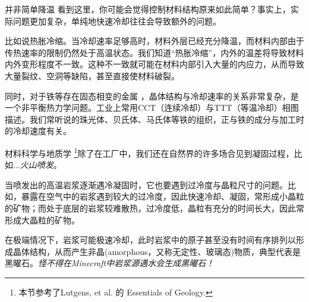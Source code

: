 \begin{example}{并非简单降温}
看到这里，你可能会觉得控制材料结构原来如此简单？事实上，实际问题更加复杂，单纯地快速冷却往往会导致额外的问题。

比如说热胀冷缩。当冷却速率足够高时，材料外层已经充分降温，而材料内部由于传热速率的限制仍然处于高温状态。我们知道“热胀冷缩”，内外的温差将导致材料内外变形程度不一致。这种不一致就可能在材料内部引入大量的内应力，从而导致大量裂纹、空洞等缺陷，甚至直接使材料破裂。

同时，对于铁等存在固态相变的金属  ，晶体结构与冷却速率的关系非常复杂，是一个非平衡热力学问题。工业上常用CCT（连续冷却）与TTT（等温冷却）相图描述。我们常听说的珠光体、贝氏体、马氏体等铁的组织，正与铁的成分与加工时的冷却速度有关。
\end{example}

\begin{example}{材料科学与地质学}
\footnote{本节参考了Lutgens, et al. 的 Essentials of Geology.}除了在工厂中，我们还在自然界的许多场合见到凝固过程，比如...\textsl{火山喷发}。

当喷发出的高温岩浆逐渐遇冷凝固时，它也要遇到过冷度与晶粒尺寸的问题。比如，暴露在空气中的岩浆遇到较大的过冷度，因此快速冷却、凝固，常形成小晶粒的矿物；而处于底层的岩浆较难散热，过冷度低，晶粒有充分的时间长大，因此常形成大晶粒的矿物。

在极端情况下，岩浆可能极速冷却，此时岩浆中的原子甚至没有时间有序排列以形成晶体结构，从而产生非晶(amorphous，又称无定性、玻璃态)物质，典型代表是黑曜石。\textsl{怪不得在Minecraft中岩浆源遇水会生成黑曜石！}
\end{example}
